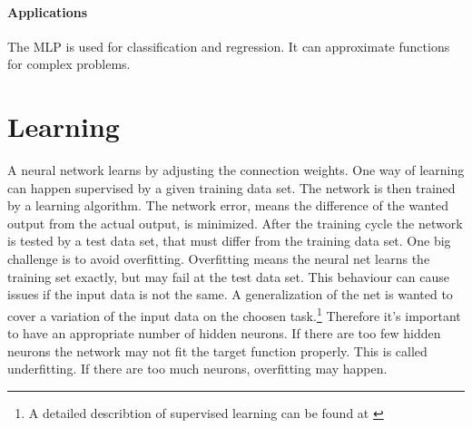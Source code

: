 \documentclass[10pt,a4paper,DIV=11]{scrreprt}
\begin{document}
\paragraph*{Applications}

The MLP is used for classification and  regression. It can approximate functions for complex problems.





\section{Learning}
A neural network learns by adjusting the connection weights.
One way of learning can happen supervised by a given training data set. The network is then trained by a learning algorithm. The network error, means the difference of the wanted output from the actual output, is minimized. After the training cycle the network is tested by a test data set, that must differ from the training data set. One big challenge is to avoid overfitting. Overfitting means the neural net learns the training set exactly, but may fail at the test data set. This behaviour can cause issues if the input data is not the same. A generalization of the net is wanted to cover a variation of the input data on the choosen task.\footnote{A detailed describtion of supervised learning can be found at \cite{Jona}} Therefore it's important to have an appropriate number of hidden neurons. If there are too few hidden neurons the network may not fit the target function properly. This is called underfitting. If there are too much neurons, overfitting may happen.\\
\end{document}
